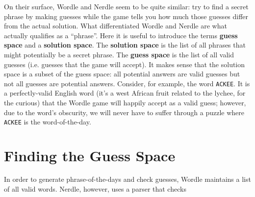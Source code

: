\documentclass[11pt, letterpaper]{article}		%
\theoremstyle{definition}
\begin{document}
On their surface, Wordle and Nerdle seem to be quite similar: try to find a secret phrase by making guesses while the game tells you how much those guesses differ from the actual solution. What differentiated Wordle and Nerdle are what actually qualifies as a ``phrase''. Here it is useful to introduce the terms \textbf{guess space} and a \textbf{solution space}. The \textbf{solution space} is the list of all phrases that might potentially be a secret phrase. The \textbf{guess space} is the list of all valid guesses (i.e. guesses that the game will accept). It makes sense that the solution space is a subset of the guess space: all potential answers are valid guesses but not all guesses are potential answers. Consider, for example, the word \texttt{ACKEE}. It is a perfectly-valid English word (it's a west African fruit related to the lychee, for the curious) that the Wordle game will happily accept as a valid guess; however, due to the word's obscurity, we will never have to suffer through a puzzle where \texttt{ACKEE} is the word-of-the-day.


\section{Finding the Guess Space}
In order to generate phrase-of-the-days and check guesses, Wordle maintains a list of all valid words. Nerdle, however, uses a parser that checks 
\end{document}
